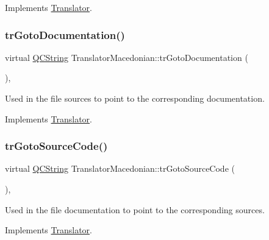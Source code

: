 Implements \mbox{\hyperlink{class_translator}{Translator}}.

\mbox{\label{class_translator_macedonian_a987c34a2f34df00099fd5e8593d0a306}} 
\subsubsection{\texorpdfstring{trGotoDocumentation()}{trGotoDocumentation()}}
{\footnotesize\ttfamily virtual \mbox{\hyperlink{class_q_c_string}{Q\+C\+String}} Translator\+Macedonian\+::tr\+Goto\+Documentation (\begin{DoxyParamCaption}{ }\end{DoxyParamCaption})\hspace{0.3cm}{\ttfamily [inline]}, {\ttfamily [virtual]}}

Used in the file sources to point to the corresponding documentation. 

Implements \mbox{\hyperlink{class_translator}{Translator}}.

\mbox{\label{class_translator_macedonian_a27a123cb0ea37e5455b8b8d1b513a8b7}} 
\subsubsection{\texorpdfstring{trGotoSourceCode()}{trGotoSourceCode()}}
{\footnotesize\ttfamily virtual \mbox{\hyperlink{class_q_c_string}{Q\+C\+String}} Translator\+Macedonian\+::tr\+Goto\+Source\+Code (\begin{DoxyParamCaption}{ }\end{DoxyParamCaption})\hspace{0.3cm}{\ttfamily [inline]}, {\ttfamily [virtual]}}

Used in the file documentation to point to the corresponding sources. 

Implements \mbox{\hyperlink{class_translator}{Translator}}.

\mbox{\label{class_translator_macedonian_ab02f5b6547ac8c46bae43bbb2db388c5}} 
